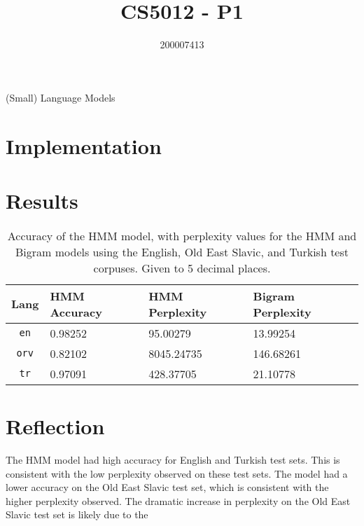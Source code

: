 \documentclass[a4paper, 12pt]{article}
\title{CS5012 - P1}
\author{200007413}
\date{}
\begin{document}
\begin{titlepage}
    \centering
    \vspace*{\fill}
    {\Huge\thetitle}

    {\LARGE(Small) Language Models}
    
    {\large\theauthor}
    \vspace*{\fill}
\end{titlepage}

\pagebreak

\section{Implementation}



\pagebreak
\section{Results}

\begin{table}[H]
    \centering
    \begin{tabular}{c | l | l | l}
        \textbf{Lang}   & \textbf{HMM Accuracy} & \textbf{HMM Perplexity}   & \textbf{Bigram Perplexity}\\
        \hline
        \texttt{en}     & 0.98252               & 95.00279                  & 13.99254                  \\
        \hline
        \texttt{orv}    & 0.82102               & 8045.24735                & 146.68261                 \\
        \hline
        \texttt{tr}     & 0.97091               & 428.37705                 & 21.10778                  \\
    \end{tabular}
    \caption{Accuracy of the HMM model, with perplexity values for the HMM and Bigram models using the English, Old East Slavic, and Turkish test corpuses. Given to 5 decimal places.}
    \label{tab:hmm-accuracy}
\end{table}

\pagebreak
\section{Reflection}

The HMM model had high accuracy for English and Turkish test sets. This is consistent with the low perplexity observed on these test sets. The model had a lower accuracy on the Old East Slavic test set, which is consistent with the higher perplexity observed. The dramatic increase in perplexity on the Old East Slavic test set is likely due to the 
\end{document}
